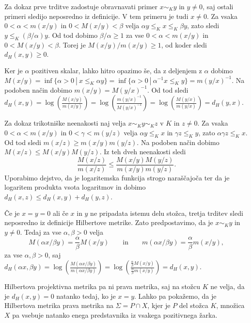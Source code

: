 \documentclass[mat2, tisk]{fmfdelo}
\begin{document}
\begin{dokaz}
Za dokaz prve trditve zadostuje obravnavati primer $x\sim_K y$ in $y\neq0$, saj ostali primeri sledijo 
neposredno iz definicije. V tem primeru je tudi $x\neq0$. Za vsaka $0<\alpha<m(x/y)$ in $0<M(x/y)<\beta$ 
velja $\alpha y\le_K x\le_K\beta y$, zato sledi $y\le_K(\beta/\alpha)y$. Od tod dobimo $\beta/\alpha\ge1$ 
za vse $0<\alpha<m(x/y)$ in $0<M(x/y)<\beta$. Torej je $M(x/y)/m(x/y)\ge1$, od koder sledi $d_H(x,y)\ge0$.

Ker je $\alpha$ pozitiven skalar, lahko hitro opazimo še, da z deljenjem z $\alpha$ dobimo 
$M(x/y)=\inf\{\alpha>0~|~x\le_K \alpha y\}=\inf\{\alpha>0~|~\alpha^{-1}x\le_K y\}=m(y/x)^{-1}$.
Na podoben način dobimo $m(x/y)=M(y/x)^{-1}$. Od tod sledi $d_H(x,y)= 
\log\!\left(\frac{M(x/y)}{m(x/y)}\right)=\log\!\left(\frac{m(y/x)^{-1}}{M(y/x)^{-1}}\right)=
\log\!\left(\frac{M(y/x)}{m(y/x)}\right)=d_H(y,x)$.

Za dokaz trikotniške neenakosti naj velja $x\sim_K y\sim_K z$ v $K$ in $z\neq0$. Za vsaka $0<\alpha<m(x/y)$ 
in $0<\gamma<m(y/z)$ velja $\alpha y\le_K x$ in $\gamma z\le_K y$, zato $\alpha\gamma z\le_K x$. Od tod 
sledi $m(x/z)\ge m(x/y)m(y/z)$. Na podoben način dobimo $M(x/z)\le M(x/y)M(y/z)$. Iz teh dveh neenakosti sledi
\[
\frac{M(x/z)}{m(x/z)}
\le
\frac{M(x/y)M(y/z)}
{m(x/y)m(y/z)}.
\]
Uporabimo dejstvo, da je logaritemska funkcija strogo naraščajoča ter da je logaritem produkta vsota logaritmov 
in dobimo $d_H(x,z)\le d_H(x,y)+d_H(y,z)$.

Če je $x=y=0$ ali če $x$ in $y$ ne pripadata
istemu delu stožca, tretja trditev sledi neposredno
iz definicije Hilbertove metrike.
Zato predpostavimo, da je $x\sim_K y$ in $y\neq0$.
Tedaj za vse $\alpha,\beta>0$ velja
\[
M(\alpha x/\beta y)=\frac{\alpha}{\beta}M(x/y)
\qquad\text{in}\qquad
m(\alpha x/\beta y)=\frac{\alpha}{\beta}m(x/y),
\]
za vse $\alpha,\beta>0$, saj $d_H(\alpha x, \beta y)= 
\log\!\left(\frac{M(\alpha x/\beta y)}{m(\alpha x/\beta y)}\right) = 
\log\!\left(\frac{\frac{\alpha}{\beta}M(x/y)}{\frac{\alpha}{\beta}m(x/y)}\right) = d_H(x,y)$.
\end{dokaz}

Hilbertova projektivna metrika pa ni prava metrika, saj na stožcu $K$ ne velja, da je 
$d_H(x,y)=0$ natanko tedaj, ko je $x=y$. Lahko pa pokažemo, da je Hilbertova metrika prava metrika 
na $\Sigma=P\cap X$, kjer je $P$ del stožca $K$, množica $X$ pa vsebuje
natanko enega predstavnika iz vsakega pozitivnega žarka.
\end{document}
